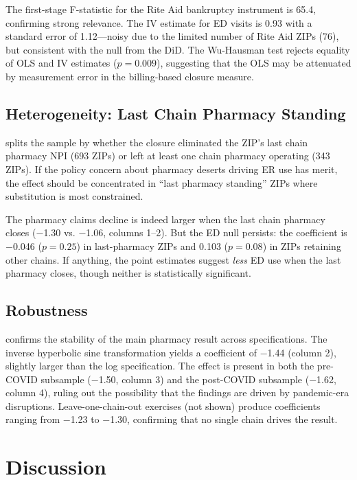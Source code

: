 \documentclass[12pt]{article}
\begin{document}
The first-stage F-statistic for the Rite Aid bankruptcy instrument is 65.4, confirming strong relevance. The IV estimate for ED visits is 0.93 with a standard error of 1.12---noisy due to the limited number of Rite Aid ZIPs (76), but consistent with the null from the DiD. The Wu-Hausman test rejects equality of OLS and IV estimates ($p = 0.009$), suggesting that the OLS may be attenuated by measurement error in the billing-based closure measure.

\subsection{Heterogeneity: Last Chain Pharmacy Standing}



 splits the sample by whether the closure eliminated the ZIP's last chain pharmacy NPI (693 ZIPs) or left at least one chain pharmacy operating (343 ZIPs). If the policy concern about pharmacy deserts driving ER use has merit, the effect should be concentrated in ``last pharmacy standing'' ZIPs where substitution is most constrained.

The pharmacy claims decline is indeed larger when the last chain pharmacy closes ($-$1.30 vs. $-$1.06, columns 1--2). But the ED null persists: the coefficient is $-$0.046 ($p = 0.25$) in last-pharmacy ZIPs and 0.103 ($p = 0.08$) in ZIPs retaining other chains. If anything, the point estimates suggest \textit{less} ED use when the last pharmacy closes, though neither is statistically significant.

\subsection{Robustness}



 confirms the stability of the main pharmacy result across specifications. The inverse hyperbolic sine transformation yields a coefficient of $-$1.44 (column 2), slightly larger than the log specification. The effect is present in both the pre-COVID subsample ($-$1.50, column 3) and the post-COVID subsample ($-$1.62, column 4), ruling out the possibility that the findings are driven by pandemic-era disruptions. Leave-one-chain-out exercises (not shown) produce coefficients ranging from $-$1.23 to $-$1.30, confirming that no single chain drives the result.

\section{Discussion}
\end{document}

